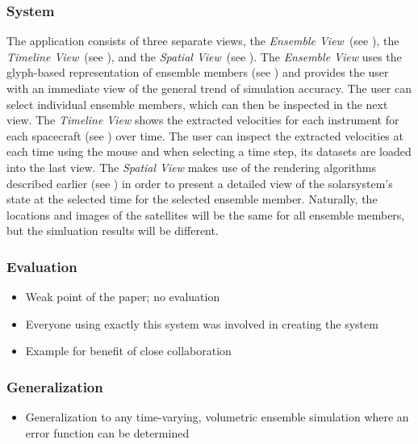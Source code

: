 \subsubsection{System} \label{contributions:astro:spaceweather:system}
The application consists of three separate views, the \emph{Ensemble View}~(see ), the \emph{Timeline View}~(see ), and the \emph{Spatial View}~(see ).  The \emph{Ensemble View} uses the glyph-based representation of ensemble members (see ) and provides the user with an immediate view of the general trend of simulation accuracy.  The user can select individual ensemble members, which can then be inspected in the next view.  The \emph{Timeline View} shows the extracted velocities for each instrument for each spacecraft (see ) over time.  The user can inspect the extracted velocities at each time using the mouse and when selecting a time step, its datasets are loaded into the last view.  The \emph{Spatial View} makes use of the rendering algorithms described earlier (see ) in order to present a detailed view of the solarsystem's state at the selected time for the selected ensemble member.  Naturally, the locations and images of the satellites will be the same for all ensemble members, but the simluation results will be different.


\subsubsection{Evaluation} \label{contributions:astro:spaceweather:evaluation}
\begin{itemize}
    \item Weak point of the paper; no evaluation
    \item Everyone using exactly this system was involved in creating the system
    \item Example for benefit of close collaboration
\end{itemize}


\subsubsection{Generalization} \label{contributions:astro:spaceweather:generalization}
\begin{itemize}
    \item Generalization to any time-varying, volumetric ensemble simulation where an error function can be determined
\end{itemize}

